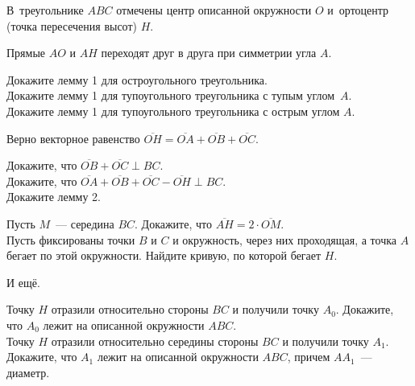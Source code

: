 \resetproblem \begingroup %
    \def\jeolmdate{30 ноября 2018 г.}%
    \def\jeolmauthors{Юлий Тихонов}%
\jeolmheader \endgroup



В~треугольнике $ABC$ отмечены центр описанной окружности $O$
и~ортоцентр (точка пересечения высот) $H$.

\begingroup
    \let\vect\overline

Прямые $AO$ и $AH$ переходят друг в друга при симметрии угла $A$.

\begin{problems}

\item
\subproblem
Докажите лемму 1 для остроугольного треугольника.
\\
\subproblem
Докажите лемму 1 для тупоугольного треугольника с тупым углом~$A$.
\\
\subproblem
Докажите лемму 1 для тупоугольного треугольника с острым углом $A$.

\end{problems}

Верно векторное равенство $\vect{OH} = \vect{OA} + \vect{OB} + \vect{OC}$.

\begin{problems}

\item
\subproblem
Докажите, что $\vect{OB} + \vect{OC} \perp BC$.
\\
\subproblem
Докажите, что $\vect{OA} + \vect{OB} + \vect{OC} - \vect{OH} \perp BC$.
\\
\subproblem
Докажите лемму 2.

\item
\subproblem
Пусть $M$~--- середина $BC$.
Докажите, что $\vect{AH} = 2 \cdot \vect{OM}$.
\\
\subproblem
Пусть фиксированы точки $B$ и $C$ и окружность, через них проходящая, а точка $A$ бегает по этой окружности.
Найдите кривую, по которой бегает $H$.

\end{problems}

И ещё.

\begin{problems}

\item
\subproblem
Точку $H$ отразили относительно стороны $BC$ и получили точку $A_0$.
Докажите, что $A_0$ лежит на описанной окружности $ABC$.
\\
\subproblem
Точку $H$ отразили относительно середины стороны $BC$ и получили точку $A_1$.
Докажите, что $A_1$ лежит на описанной окружности $ABC$, причем $AA_1$~--- диаметр.

\end{problems}

